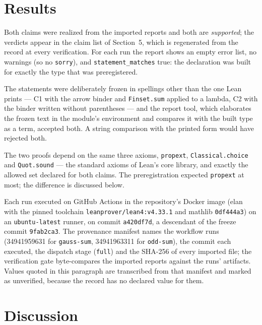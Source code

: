 \documentclass[journal,article,submit,pdftex,moreauthors]{Definitions/mdpi}
\providecommand{\unverified}[1]{#1}
\begin{document}
\section{Results}

Both claims were realized from the imported reports and both are \emph{supported}; the verdicts appear in the claim list of Section~5, which is regenerated from the record at every verification. For each run the report shows an empty error list, no warnings (so no \texttt{sorry}), and \texttt{statement\_matches} true: the declaration was built for exactly the type that was preregistered.

The statements were deliberately frozen in spellings other than the one Lean prints --- C1 with the arrow binder and \texttt{Finset.sum} applied to a lambda, C2 with the binder written without parentheses --- and the report tool, which elaborates the frozen text in the module's environment and compares it with the built type as a term, accepted both. A string comparison with the printed form would have rejected both.

The two proofs depend on the same three axioms, \texttt{propext}, \texttt{Classical.choice} and \texttt{Quot.sound} --- the standard axioms of Lean's core library, and exactly the allowed set declared for both claims. The preregistration expected \texttt{propext} at most; the difference is discussed below.

Each run executed on GitHub Actions in the repository's Docker image (elan with the pinned toolchain \texttt{leanprover/lean4:v4.33.1} and mathlib \unverified{\texttt{0df444a3}}) on an \texttt{ubuntu-latest} runner, on commit \unverified{\texttt{a420df7d}}, a descendant of the freeze commit \unverified{\texttt{9fab2ca3}}. The provenance manifest names the workflow runs (\unverified{34941959631} for \texttt{gauss-sum}, \unverified{34941963311} for \texttt{odd-sum}), the commit each executed, the dispatch stage (\texttt{full}) and the SHA-256 of every imported file; the verification gate byte-compares the imported reports against the runs' artifacts. Values quoted in this paragraph are transcribed from that manifest and marked as unverified, because the record has no declared value for them.

\section{Discussion}
\end{document}
